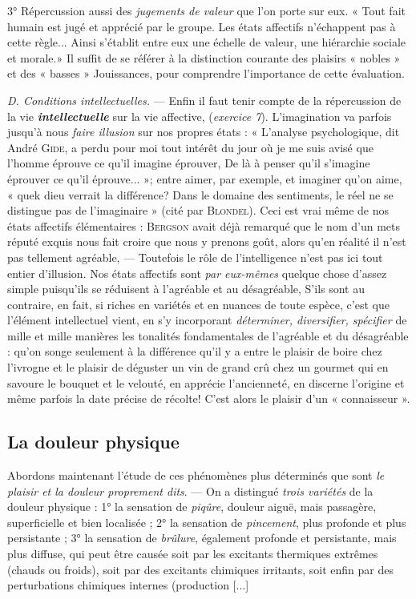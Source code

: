 3° Répercussion aussi des {\it jugements de valeur} que l’on porte sur
eux. « Tout fait humain est jugé et apprécié par le groupe. Les états
affectifs n’échappent pas à cette règle... Ainsi s'établit entre eux une
échelle de valeur, une hiérarchie sociale et morale.» Il suffit de se
référer à la distinction courante des plaisirs « nobles » et des « basses »
Jouissances, pour comprendre l’importance de cette évaluation.

{\it D. Conditions intellectuelles.} — Enfin il faut tenir compte de la
répercussion de la vie \textbf{\textit {intellectuelle}} sur la vie affective, ({\it exercice 7}).
L'imagination va parfois jusqu’à nous {\it faire illusion} sur nos propres
états : « L'analyse psychologique, dit André \textsc{Gide}, a perdu pour moi
tout intérêt du jour où je me suis avisé que l’homme éprouve ce qu’il
imagine éprouver, De là à penser qu’il s’imagine éprouver ce qu’il
éprouve... »; entre aimer, par exemple, et imaginer qu’on aime,
« quek dieu verrait la différence? Dans le domaine des sentiments, le
réel ne se distingue pas de l'imaginaire » (cité par \textsc{Blondel}). Ceci
est vrai même de nos états affectifs élémentaires : \textsc{Bergson} avait
déjà remarqué que le nom d’un mets réputé exquis nous fait croire
que nous y prenons goût, alors qu’en réalité il n’est pas tellement
agréable, — Toutefois le rôle de l'intelligence n’est pas ici tout entier
d'illusion. Nos états affectifs sont {\it par eux-mêmes} quelque chose d’assez
simple puisqu'ils se réduisent à l’agréable et au désagréable, S'ils
sont au contraire, en fait, si riches en variétés et en nuances de
toute espèce, c’est que l’élément intellectuel vient, en s’y incorporant
{\it déterminer, diversifier, spécifier} de mille et mille manières les tonalités
fondamentales de l’agréable et du désagréable : qu’on songe
seulement à la différence qu’il y a entre le plaisir de boire chez l’ivrogne
et le plaisir de déguster un vin de grand crû chez un gourmet qui en
savoure le bouquet et le velouté, en apprécie l'ancienneté, en discerne
l’origine et même parfois la date précise de récolte! C’est alors le
plaisir d’un « connaisseur ».

\subsection{La douleur physique} %
Abordons maintenant l'étude de
ces phénomènes plus déterminés que sont {\it le plaisir et la douleur
proprement dits}. — On a distingué {\it trois variétés} de la douleur physique :
1° la sensation de {\it piqûre}, douleur aiguë, mais passagère, superficielle
et bien localisée ; 2° la sensation de {\it pincement}, plus profonde et plus
persistante ; 3° la sensation de {\it brûlure}, également profonde et persistante,
mais plus diffuse, qui peut être causée soit par les excitants
thermiques extrêmes (chauds ou froids), soit par des excitants chimiques
irritants, soit enfin par des perturbations chimiques internes (production [...]
